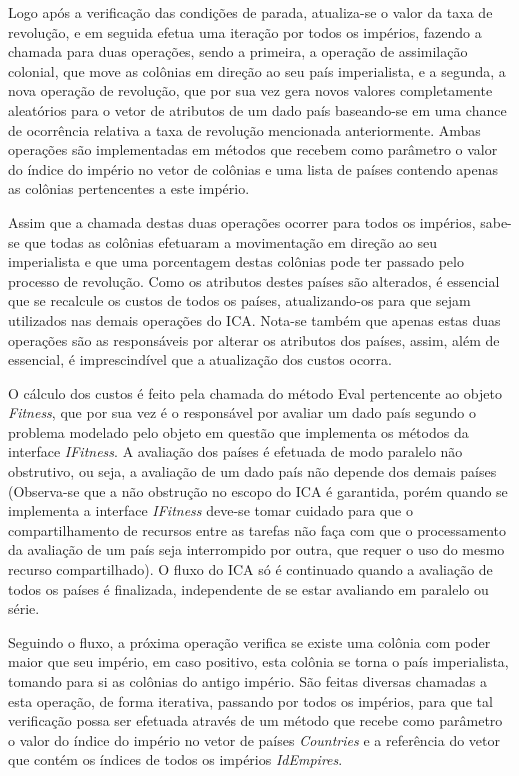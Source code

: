 Logo após a verificação das condições de parada, atualiza-se o valor da taxa de revolução, e em seguida efetua uma iteração por todos os impérios, fazendo a chamada para duas operações, sendo a primeira, a operação de assimilação colonial, que move as colônias em direção ao seu país imperialista, e a segunda, a nova operação de revolução, que por sua vez gera novos valores completamente aleatórios para o vetor de atributos de um dado país baseando-se em uma chance de ocorrência relativa a taxa de revolução mencionada anteriormente. Ambas operações são implementadas em métodos que recebem como parâmetro o valor do índice do império no vetor de colônias e uma lista de países contendo apenas as colônias pertencentes a este império.

Assim que a chamada destas duas operações ocorrer para todos os impérios, sabe-se que todas as colônias efetuaram a movimentação em direção ao seu imperialista e que uma porcentagem destas colônias pode ter passado pelo processo de revolução. Como os atributos destes países são alterados, é essencial que se recalcule os custos de todos os países, atualizando-os para que sejam utilizados nas demais operações do ICA. Nota-se também que apenas estas duas operações são as responsáveis por alterar os atributos dos países, assim, além de essencial, é imprescindível que a atualização dos custos ocorra.

O cálculo dos custos é feito pela chamada do método Eval pertencente ao objeto \emph{Fitness}, que por sua vez é o responsável por avaliar um dado país segundo o problema modelado pelo objeto em questão que implementa os métodos da interface \emph{IFitness}. A avaliação dos países é efetuada de modo paralelo não obstrutivo, ou seja, a avaliação de um dado país não depende dos demais países (Observa-se que a não obstrução no escopo do ICA é garantida, porém quando se implementa a interface \emph{IFitness} deve-se tomar cuidado para que o compartilhamento de recursos entre as tarefas não faça com que o processamento da avaliação de um país seja interrompido por outra, que requer o uso do mesmo recurso compartilhado). O fluxo do ICA só é continuado quando a avaliação de todos os países é finalizada, independente de se estar avaliando em paralelo ou série.

Seguindo o fluxo, a próxima operação verifica se existe uma colônia com poder maior que seu império, em caso positivo, esta colônia se torna o país imperialista, tomando para si as colônias do antigo império. São feitas diversas chamadas a esta operação, de forma iterativa, passando por todos os impérios, para que tal verificação possa ser efetuada através de um método que recebe como parâmetro o valor do índice do império no vetor de países \emph{Countries} e a referência do vetor que contém os índices de todos os impérios \emph{IdEmpires}.  


